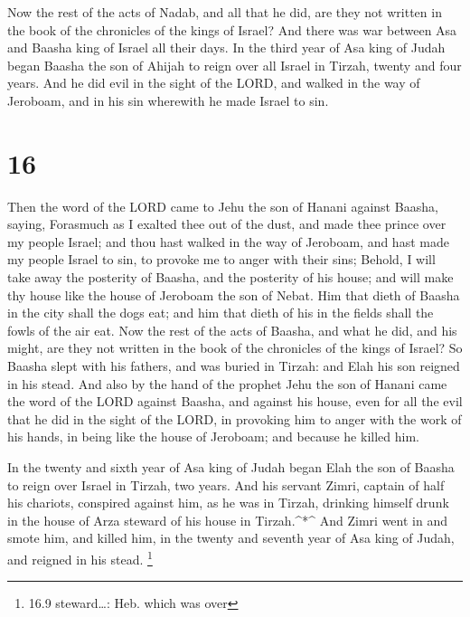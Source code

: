  Now the rest of the acts of Nadab, and all that he did,
are they not written in the book of the chronicles of the kings of
Israel?  And there was war between Asa and Baasha king of
Israel all their days.  In the third year of Asa king of
Judah began Baasha the son of Ahijah to reign over all Israel in Tirzah,
twenty and four years.  And he did evil in the sight of the
LORD, and walked in the way of Jeroboam, and in his sin wherewith he
made Israel to sin.

\hypertarget{section-15}{%
\section{16}\label{section-15}}

 Then the word of the LORD came to Jehu the son of Hanani
against Baasha, saying,  Forasmuch as I exalted thee out of
the dust, and made thee prince over my people Israel; and thou hast
walked in the way of Jeroboam, and hast made my people Israel to sin, to
provoke me to anger with their sins;  Behold, I will take
away the posterity of Baasha, and the posterity of his house; and will
make thy house like the house of Jeroboam the son of Nebat. 
Him that dieth of Baasha in the city shall the dogs eat; and him that
dieth of his in the fields shall the fowls of the air eat. 
Now the rest of the acts of Baasha, and what he did, and his might, are
they not written in the book of the chronicles of the kings of Israel?
 So Baasha slept with his fathers, and was buried in Tirzah:
and Elah his son reigned in his stead.  And also by the hand
of the prophet Jehu the son of Hanani came the word of the LORD against
Baasha, and against his house, even for all the evil that he did in the
sight of the LORD, in provoking him to anger with the work of his hands,
in being like the house of Jeroboam; and because he killed him.

 In the twenty and sixth year of Asa king of Judah began
Elah the son of Baasha to reign over Israel in Tirzah, two years.
 And his servant Zimri, captain of half his chariots,
conspired against him, as he was in Tirzah, drinking himself drunk in
the house of Arza steward of his house in Tirzah.\^{}*\^{} 
And Zimri went in and smote him, and killed him, in the twenty and
seventh year of Asa king of Judah, and reigned in his stead. \footnote{16.9
  steward\ldots: Heb. which was over}

